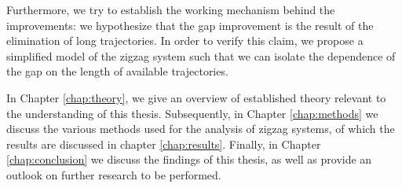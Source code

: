 	Furthermore, we try to establish the working mechanism behind the improvements: we hypothesize that the gap improvement is the result of the elimination of long trajectories.
	In order to verify this claim, we propose a simplified model of the zigzag system such that we can isolate the dependence of the gap on the length of available trajectories.

	In Chapter \ref{chap:theory}, we give an overview of established theory relevant to the understanding of this thesis.
	Subsequently, in Chapter \ref{chap:methods} we discuss the various methods used for the analysis of zigzag systems, of which the results are discussed in chapter \ref{chap:results}.
	Finally, in Chapter \ref{chap:conclusion} we discuss the findings of this thesis, as well as provide an outlook on further research to be performed.